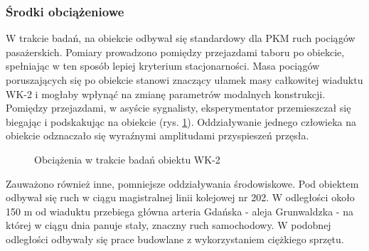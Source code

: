 \subsubsection{Środki obciążeniowe}
W trakcie badań, na obiekcie odbywał się standardowy dla PKM ruch pociągów pasażerskich. Pomiary prowadzono pomiędzy przejazdami taboru po obiekcie, spełniając w ten sposób lepiej kryterium stacjonarności. Masa pociągów poruszających się po obiekcie stanowi znaczący ułamek masy całkowitej wiaduktu WK-2 i mogłaby wpłynąć na zmianę parametrów modalnych konstrukcji. Pomiędzy przejazdami, w asyście sygnalisty, eksperymentator przemieszczał się biegając i podskakując na obiekcie (rys. \ref{fig: wk2_foto_obciazenia}). Oddziaływanie jednego człowieka na obiekcie odznaczało się wyraźnymi amplitudami przyspieszeń przęsła. 
\begin{figure}[hbt!]
	\centering
	 \quad
	\captionsetup{justification=centering}
	\caption{Obciążenia w trakcie badań obiektu WK-2}
	\label{fig: wk2_foto_obciazenia}
\end{figure}

Zauważono również inne, pomniejsze oddziaływania środowiskowe. Pod obiektem odbywał się ruch w ciągu magistralnej linii kolejowej nr 202. W odległości około 150 m od wiaduktu przebiega główna arteria Gdańska - aleja Grunwaldzka - na której w ciągu dnia panuje stały, znaczny ruch samochodowy. W podobnej odległości odbywały się prace budowlane z wykorzystaniem ciężkiego sprzętu.



